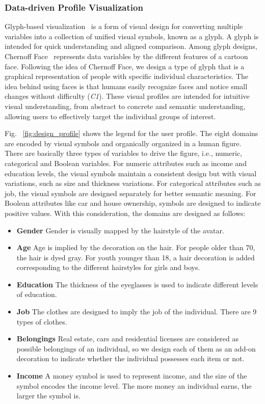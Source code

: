 \documentclass{ieeeaccess}
\begin{document}
\subsubsection{Data-driven Profile Visualization}

Glyph-based visualization~\cite{borgo2013glyph} is a form of visual design for converting multiple variables into a collection of unified visual symbols, known as a glyph. A glyph is intended for quick understanding and aligned comparison. Among glyph designs, Chernoff Face~\cite{chernoff1973use} represents data variables by the different features of a cartoon face. Following the idea of Chernoff Face, we design a type of glyph that is a graphical representation of people with specific individual characteristics. The idea behind using faces is that humans easily recognize faces and notice small changes without difficulty (\textit{C1}). These visual profiles are intended for intuitive visual understanding, from abstract to concrete and semantic understanding, allowing users to effectively target the individual groups of interest.

Fig. ~\ref{fig:design_profile} shows the legend for the user profile. The eight domains are encoded by visual symbols and organically organized in a human figure. There are basically three types of variables to drive the figure, i.e., numeric, categorical and Boolean variables. For numeric attributes such as income and education levels, the visual symbols maintain a consistent design but with visual variations, such as size and thickness variations. For categorical attributes such as job, the visual symbols are designed separately for better semantic meaning. For  Boolean attributes like car and house ownership, symbols are designed to indicate positive values. With this consideration, the domains are designed as follows:


\begin{itemize}
\item \textbf{Gender} Gender is visually mapped by the hairstyle of the avatar.
\item \textbf{Age} Age is implied by the decoration on the hair. For people older than 70, the hair is dyed gray. For youth younger than 18, a hair decoration is added corresponding to the different hairstyles for girls and boys.
\item \textbf{Education} The thickness of the eyeglasses is used to indicate different levels of education.
\item \textbf{Job} The clothes are designed to imply the job of the individual. There are 9 types of clothes.
\item \textbf{Belongings} Real estate, cars and residential licenses are considered as possible belongings of an individual, so we design each of them as an add-on decoration to indicate whether the individual possesses each item or not.
\item \textbf{Income} A money symbol is used to represent income, and the size of the symbol encodes the income level. The more money an individual earns, the larger the symbol is.
\end{itemize}
\end{document}
